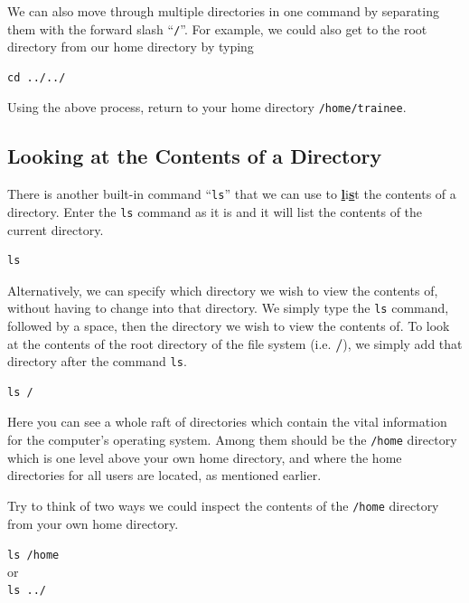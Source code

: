 We can also move through multiple directories in one command by separating them with the forward slash ``\texttt{/}''.
For example, we could also get to the root directory from our home directory by typing \\
\begin{lstlisting}
cd ../../ 
\end{lstlisting}

\begin{steps}
Using the above process, return to your home directory \texttt{/home/trainee}. \\
\end{steps}

\subsection{Looking at the Contents of a Directory}
\begin{steps}
There is another built-in command ``\texttt{ls}'' that we can use to \textbf{\underline{l}}i\textbf{\underline{s}}t the contents of a directory.
Enter the \texttt{ls} command as it is and it will list the contents of the current directory. \\
\begin{lstlisting}
ls 
\end{lstlisting}
\end{steps}

\begin{steps}
Alternatively, we can specify which directory we wish to view the contents of, without having to change into that directory.
We simply type the \texttt{ls} command, followed by a space, then the directory we wish to view the contents of.
To look at the contents of the root directory of the file system (i.e. \textbf{/}), we simply add that directory after the command \texttt{ls}. \\
\begin{lstlisting}
ls /
\end{lstlisting}
\end{steps}

Here you can see a whole raft of directories which contain the vital information for the computer's operating system.
Among them should be the \texttt{/home} directory which is one level above your own home directory, and where the home directories for all users are located, as mentioned earlier.\\

\begin{questions}
Try to think of two ways we could inspect the contents of the \texttt{/home} directory from your own home directory. \\
\begin{answer}
\texttt{ls /home} \\
or \\
\texttt{ls ../} \\
\end{answer}
\end{questions}

